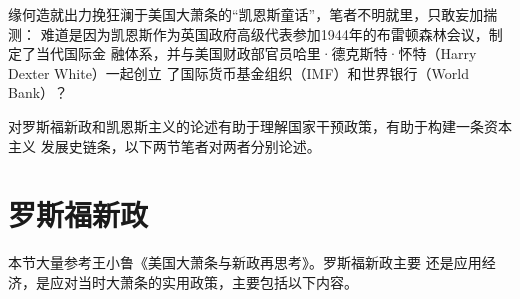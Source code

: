 缘何造就出力挽狂澜于美国大萧条的“凯恩斯童话”，笔者不明就里，只敢妄加揣测：
难道是因为凯恩斯作为英国政府高级代表参加1944年的布雷顿森林会议，制定了当代国际金
融体系，并与美国财政部官员哈里·德克斯特·怀特（Harry Dexter White）一起创立
了国际货币基金组织（IMF）和世界银行（World Bank）？


对罗斯福新政和凯恩斯主义的论述有助于理解国家干预政策，有助于构建一条资本主义
发展史链条，以下两节笔者对两者分别论述。


\section{罗斯福新政}

本节大量参考王小鲁《美国大萧条与新政再思考》\cite{bijiao202002}。罗斯福新政主要
还是应用经济，是应对当时大萧条的实用政策，主要包括以下内容。

